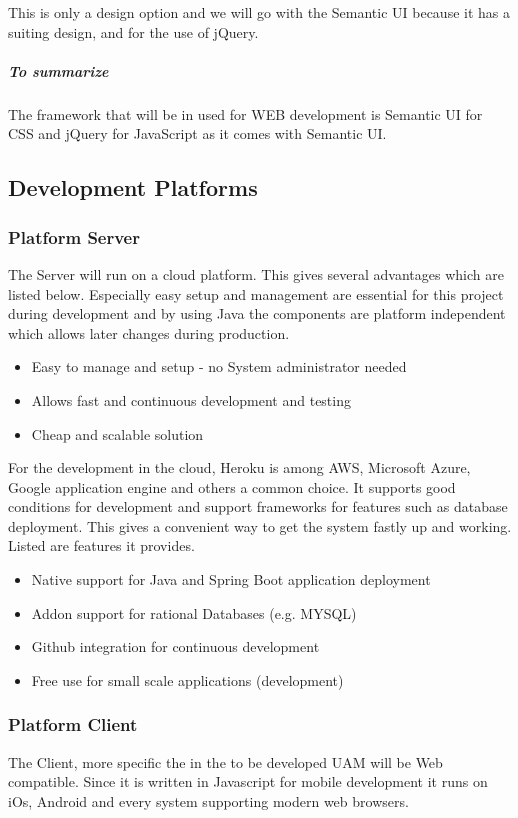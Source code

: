 \documentclass[a4paper,11pt]{article}
\begin{document}
\noindent This is only a design option and we will go with the Semantic UI because it has a suiting design, and for the use of jQuery. 

\subparagraph{To summarize}\label{to-summarize}
The framework that will be in used for WEB development is Semantic UI
for CSS and jQuery for JavaScript as it comes with Semantic UI.

\subsection{Development Platforms}

\subsubsection{Platform Server}
The Server will run on a cloud platform. This gives several advantages which are listed below. Especially easy setup and management are essential for this project during development and by using Java the components are platform independent which allows later changes during production.
\begin{itemize}
\item Easy to manage and setup - no System administrator needed
\item Allows fast and continuous development and testing
\item Cheap and scalable solution
\end{itemize}

For the development in the cloud, Heroku is among AWS, Microsoft Azure, Google application engine and others a common choice. It supports good conditions for development and support frameworks for features such as database deployment. This gives a convenient way to get the system fastly up and working. Listed are features it provides.
\begin{itemize}
\item Native support for Java and Spring Boot application deployment
\item Addon support for rational Databases (e.g. MYSQL)
\item Github integration for continuous development
\item Free use for small scale applications (development)
\end{itemize}

\subsubsection{Platform Client}
The Client, more specific the in the to be developed UAM will be Web compatible. Since it is written in Javascript for mobile development it runs on iOs, Android and every system supporting modern web browsers.
\end{document}
